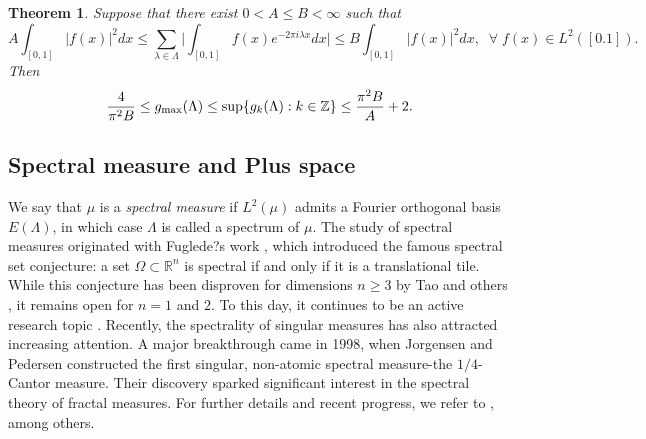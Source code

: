 \documentclass[12pt,psfig,reqno]{amsart}
\numberwithin{equation}{section}
\theoremstyle{plain}
\newtheorem{thm}{Theorem}[section]
\begin{document}
\begin{thm}\label{thm1.5}
Suppose that there exist $0<A\leq B<\infty$ such that 
	\[
 A\int_{[0,1]} |f(x)|^2dx\leq\sum_{\lambda\in\Lambda}\Big|\int_{[0,1]} f(x)e^{-2\pi i\lambda x}dx\Big|\leq B\int_{[0,1]} |f(x)|^2dx,\;\;\forall\;f(x)\in L^2([0.1]). 
	\]
Then \[
\frac{4}{\pi^2 B}\leq g_{\max}(\Lambda)\leq \sup\{g_k(\Lambda):k\in\Bbb Z\}\leq\frac{\pi^2B}{A}+2.
\]
\end{thm}
\subsection{Spectral measure and Plus space}
We say that $\mu$ is a {\textit{spectral measure}} if $L^2(\mu)$ admits a Fourier orthogonal basis $E(\Lambda)$, in which case $\Lambda$ is called a spectrum of $\mu$. 
The study of spectral measures originated with Fuglede?s work \cite{Fug74}, which introduced the famous spectral set conjecture: a set $\Omega \subset \mathbb{R}^n$ is spectral if and only if it is a translational tile. While this conjecture has been disproven for dimensions $n \geq 3$ by Tao and others \cite{KM06, Ma05, Tao}, it remains open for $n = 1$ and $2$. To this day, it continues to be an active research topic \cite{FFLS19,IKT03, La01, LM22}. Recently, the spectrality of singular measures has also attracted increasing attention.
A major breakthrough came in 1998, when Jorgensen and Pedersen \cite{JP98} constructed the first singular, non-atomic spectral measure-the $1/4$-Cantor measure. Their discovery sparked significant interest in the spectral theory of fractal measures. For further details and recent progress, we refer to \cite{Dai16, Dai12, DHL14}, among others.
\end{document}
